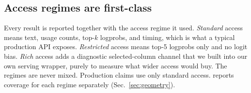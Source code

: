 \subsection{Access regimes are first-class}
\label{sec:regimes}
Every result is reported together with the access regime it used.  \emph{Standard}
access means text, usage counts, top-$k$ logprobs, and timing, which is what a typical
production API exposes.  \emph{Restricted} access means top-5 logprobs only and no logit
bias.  \emph{Rich} access adds a diagnostic selected-column channel that we built into
our own serving wrapper, purely to measure what wider access would buy.  The regimes are
never mixed.  Production claims use only standard access.  \benchname{} reports coverage
for each regime separately (Sec.~\ref{sec:geometry}).
